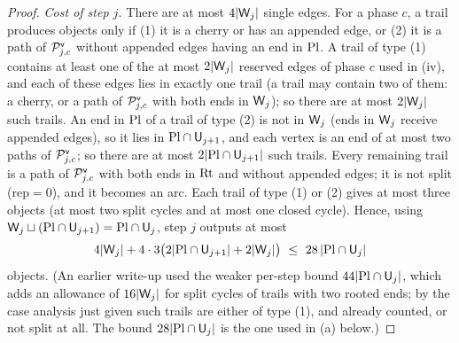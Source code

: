 \begin{proof}
\emph{Cost of step $j$.} There are at most $4|\mathsf{W}_j|$ single edges. For a phase $c$, a trail produces objects only if
(1) it is a cherry or has an appended edge, or (2) it is a path of $\mathcal{P}^{\mathsf{v}}_{j,c}$ without appended edges having an
end in $\mathrm{Pl}$. A trail of type (1) contains at least one of the at most $2|\mathsf{W}_j|$ reserved edges of phase $c$ used in
(iv), and each of these edges lies in exactly one trail (a trail may contain two of them: a cherry, or a path of
$\mathcal{P}^{\mathsf{v}}_{j,c}$ with both ends in $\mathsf{W}_j$); so there are at most $2|\mathsf{W}_j|$ such trails. An end in $\mathrm{Pl}$ of a trail of type (2) is not in $\mathsf{W}_j$ (ends in $\mathsf{W}_j$ receive appended edges), so it
lies in $\mathrm{Pl}\cap\mathsf{U}_{j+1}$, and each vertex is an end of at most two paths of $\mathcal{P}^{\mathsf{v}}_{j,c}$; so there are at most
$2|\mathrm{Pl}\cap\mathsf{U}_{j+1}|$ such trails. Every remaining trail is a path of $\mathcal{P}^{\mathsf{v}}_{j,c}$ with both ends in $\mathrm{Rt}$ and
without appended edges; it is not split ($\mathrm{rep}=0$), and it becomes an arc. Each trail of type (1) or (2) gives
at most three objects (at most two split cycles and at most one closed cycle). Hence, using
$\mathsf{W}_j\sqcup(\mathrm{Pl}\cap\mathsf{U}_{j+1})=\mathrm{Pl}\cap\mathsf{U}_j$, step $j$ outputs at most
\begin{equation}\label{s4:eqPVstep}
4|\vW_j|+4\cdot3\bigl(2|\Pl\cap\vU_{j+1}|+2|\vW_j|\bigr)\ \le\ 28\,|\Pl\cap\vU_j|
\end{equation}
objects. (An earlier write-up used the weaker per-step bound $44|\mathrm{Pl}\cap\mathsf{U}_j|$, which adds an allowance of
$16|\mathsf{W}_j|$ for split cycles of trails with two rooted ends; by the case analysis just given such trails are either
of type (1), and already counted, or not split at all. The bound $28|\mathrm{Pl}\cap\mathsf{U}_j|$ is the one used in (a) below.)


\end{proof}
